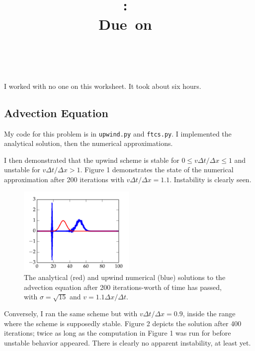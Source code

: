 \documentclass{article}
\title{\vspace{2in}\textmd{\textbf{\hmwkClass:\ \hmwkTitle}}\\\normalsize\vspace{0.1in}\small{Due\ on\ \hmwkDueDate}\\\vspace{0.1in}\large{\textit{\hmwkClassInstructor\ \hmwkClassTime}}\vspace{3in}}
\date{}
\author{\textbf{\hmwkAuthorName}}
\begin{document}
\begin{spacing}{1.1}

\newpage


I worked with no one on this worksheet. It took about six hours.

\subsection{Advection Equation}

My code for this problem is in \texttt{upwind.py} and \texttt{ftcs.py}. I implemented the analytical solution, then the numerical approximations.

I then demonstrated that the upwind scheme is stable for \(0 \le v \Delta t / \Delta x \le 1\) and unstable for \(v \Delta t / \Delta x > 1\). Figure 1 demonstrates the state of the numerical approximation after 200 iterations with \(v \Delta t / \Delta x = 1.1\). Instability is clearly seen.

\begin{figure}[H]
 \centering
 \hspace{0cm} \includegraphics[width=0.5\textwidth]{fig-v-1pt1.pdf}
 \caption{The analytical (red) and upwind numerical (blue) solutions to the advection equation after 200 iterations-worth of time has passed, with \(\sigma = \sqrt{15}\) and \(v = 1.1 \Delta x / \Delta t\).}
 \label{fig-v-1pt1}
\end{figure} 

Conversely, I ran the same scheme but with \(v \Delta t / \Delta x = 0.9\), inside the range where the scheme is supposedly stable. Figure 2 depicts the solution after 400 iterations; twice as long as the computation in Figure 1 was run for before unstable behavior appeared. There is clearly no apparent instability, at least yet.	


\end{spacing}
\end{document}

